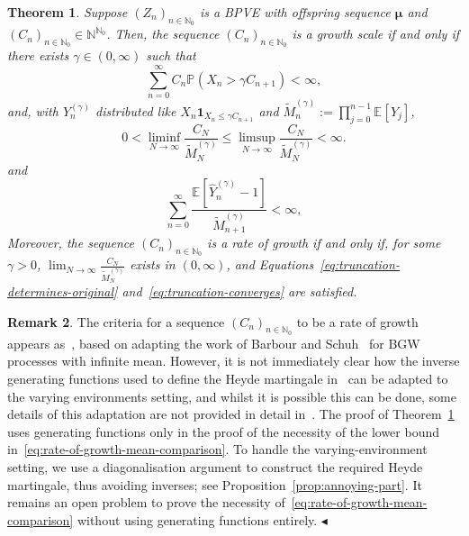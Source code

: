 \documentclass[12pt]{article}
\newtheorem{thm}{Theorem}[section]
\theoremstyle{definition}
\newtheorem{rmq}[thm]{Remark}
\newcommand{\E}[2][]{\ensuremath{\mathbb{E}_{#1}\left[#2 \right]}}
\newcommand{\Prob}[2][]{\ensuremath{\mathbb{P}_{#1} \left(#2 \right)}}
\newcommand{\ensymboldremark }{\hfill$\blacktriangleleft$}
\begin{document}
\begin{thm} \label{thm:rate-of-growth}
    Suppose $(Z_{n})_{n\in \mathbb{N}_0}$ is a BPVE with offspring sequence $\boldsymbol{\mu}$ and $(C_{n})_{n \in \mathbb{N}_0} \in \mathbb{N}^{\mathbb{N}_0}$. Then, the sequence $(C_{n})_{n \in \mathbb{N}_0}$ is a growth scale if and only if there exists $\gamma \in (0, \infty)$ such that
        \begin{equation} \label{eq:truncation-determines-original}
            \sum_{n=0}^{\infty} C_{n} \Prob{X_{n} > \gamma C_{n+1}} < \infty,
        \end{equation}
        and, with $Y^{(\gamma)}_{n}$ distributed like $X_{n} \mathbf{1}_{X_{n} \leq \gamma C_{n+1}}$ and
        $\tilde{M}^{(\gamma)}_{n} := \prod_{j=0}^{n-1} \E{Y_{j}}$, 
        \begin{equation} \label{eq:rate-of-growth-mean-comparison}
            0 < \liminf_{N \to \infty} \frac{C_{N}}{\tilde{M}^{(\gamma)}_{N}} \leq \limsup_{N \to \infty} \frac{C_{N}}{\tilde{M}^{(\gamma)}_{N}} < \infty. 
        \end{equation}
        and
        \begin{equation} \label{eq:truncation-converges}
        \sum_{n=0}^{\infty} \frac{\E{\widehat{Y}^{(\gamma)}_{n} - 1}}{\tilde{M}^{(\gamma)}_{n+1}} < \infty,
        \end{equation}
    Moreover, the sequence $(C_{n})_{n \in \mathbb{N}_0}$ is a rate of growth if and only if, for some $\gamma > 0$, $\lim_{N \to \infty} \frac{C_{N}}{\tilde{M}^{(\gamma)}_{N}}$ exists in $(0,\infty)$, and Equations~\eqref{eq:truncation-determines-original} and~\eqref{eq:truncation-converges} are satisfied.   
\end{thm}

\begin{rmq}
    The criteria for a sequence $(C_{n})_{n \in \mathbb{N}_0}$ to be a rate of growth appears as~\cite[Lemma~1]{dsouza-rates-of-growth}, based on adapting the work of Barbour and Schuh~\cite{schuh-barbour-infinite-mean} for BGW processes with infinite mean. However, it is not immediately clear how the inverse generating functions used to define the Heyde martingale in~\cite{schuh-barbour-infinite-mean} can be adapted to the varying environments setting, and whilst it is possible this can be done, some details of this adaptation are not provided in detail in~\cite{dsouza-rates-of-growth}. The proof of Theorem~\ref{thm:rate-of-growth} uses generating functions only in the proof of the necessity of the lower bound in~\eqref{eq:rate-of-growth-mean-comparison}. To handle the varying-environment setting, we use a diagonalisation argument to construct the required Heyde martingale, thus avoiding inverses; see Proposition~\ref{prop:annoying-part}. It remains an open problem to prove the necessity of~\eqref{eq:rate-of-growth-mean-comparison} without using generating functions entirely.   {\small\ensymboldremark }
\end{rmq}
\end{document}
